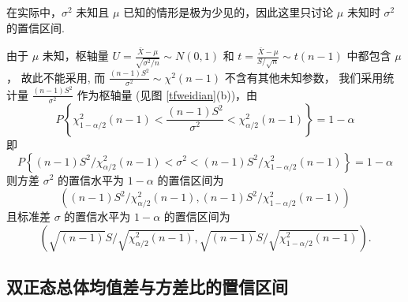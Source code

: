在实际中，$\sigma^{2} $ 未知且 $ \mu $ 已知的情形是极为少见的，因此这里只讨论 $ \mu $ 未知时 $ \sigma^{2} $ 的置信区间.

\begin{theorem}
    由于 $ \mu $ 未知，枢轴量 $\displaystyle U=\frac{\bar{X}-\mu}{\sqrt{\sigma^{2} / n}} \sim N(0,1) $ 和 $\displaystyle t=\frac{\bar{X}-\mu}{S / \sqrt{n}} \sim t(n-1) $ 中都包含 $ \mu$，
    故此不能采用, 而 $\displaystyle \frac{(n-1) S^{2}}{\sigma^{2}} \sim \chi^{2}(n-1) $ 不含有其他未知参数，
    我们采用统计量 $\displaystyle \frac{(n-1) S^{2}}{\sigma^{2}} $ 作为枢轴量 (见图 \ref{tfweidian}(b))，由
    $$P\left\{\chi_{1-\alpha / 2}^{2}(n-1)<\frac{(n-1) S^{2}}{\sigma^{2}}<\chi_{\alpha / 2}^{2}(n-1)\right\}=1-\alpha$$
    即
    $$P\left\{(n-1) S^{2} / \chi_{\alpha / 2}^{2}(n-1)<\sigma^{2}<(n-1) S^{2} / \chi_{1-\alpha / 2}^{2}(n-1)\right\}=1-\alpha$$
    则方差 $ \sigma^{2} $ 的置信水平为 $ 1-\alpha $ 的置信区间为
    $$\left((n-1) S^{2} / \chi_{\alpha / 2}^{2}(n-1),(n-1) S^{2} / \chi_{1-\alpha / 2}^{2}(n-1)\right)$$
    且标准差 $ \sigma $ 的置信水平为 $ 1-\alpha $ 的置信区间为
    $$\left(\sqrt{(n-1)} S / \sqrt{\chi_{\alpha / 2}^{2}(n-1)}, \sqrt{(n-1)} S / \sqrt{\chi_{1-\alpha / 2}^{2}(n-1)}\right) .$$
\end{theorem}

\subsection{双正态总体均值差与方差比的置信区间}

